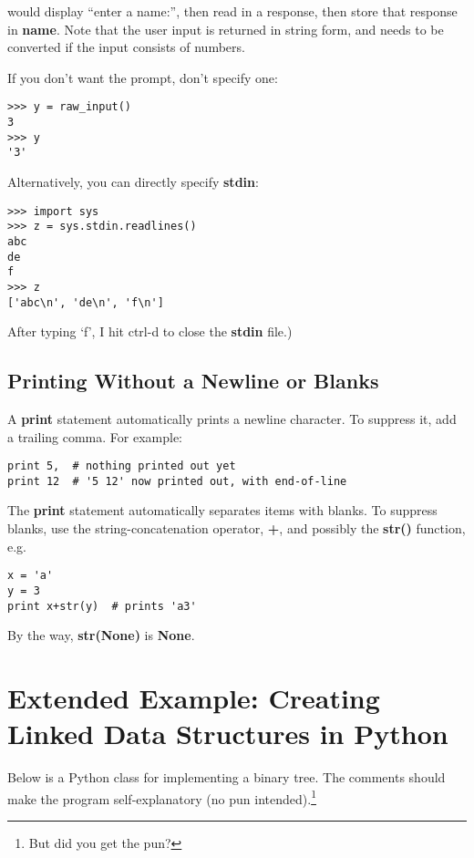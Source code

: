 would display ``enter a name:'', then read in a response, then store
that response in {\bf name}.  Note that the user input is returned in
string form, and needs to be converted if the input consists of numbers.

If you don't want the prompt, don't specify one:

\begin{Verbatim}[fontsize=\relsize{-2}]
>>> y = raw_input()
3
>>> y
'3'
\end{Verbatim} 

Alternatively, you can directly specify {\bf stdin}:

\begin{Verbatim}[fontsize=\relsize{-2}]
>>> import sys
>>> z = sys.stdin.readlines()
abc
de
f
>>> z
['abc\n', 'de\n', 'f\n']
\end{Verbatim}

After typing `f', I hit ctrl-d to close the {\bf stdin} file.)

\subsection{Printing Without a Newline or Blanks}

A {\bf print} statement automatically prints a newline character.  To
suppress it, add a trailing comma.  For example:

\begin{Verbatim}[fontsize=\relsize{-2}]
print 5,  # nothing printed out yet
print 12  # '5 12' now printed out, with end-of-line
\end{Verbatim}

The {\bf print} statement automatically separates items with blanks.  To
suppress blanks, use the string-concatenation operator, {\bf +}, and
possibly the {\bf str()} function, e.g.

\begin{Verbatim}[fontsize=\relsize{-2}]
x = 'a'
y = 3
print x+str(y)  # prints 'a3'
\end{Verbatim}

By the way, {\bf str(None)} is {\bf None}.

\section{Extended Example:  Creating Linked Data Structures in Python}

Below is a Python class for implementing a binary tree.  The comments
should make the program self-explanatory (no pun intended).\footnote{But
did you get the pun?}

